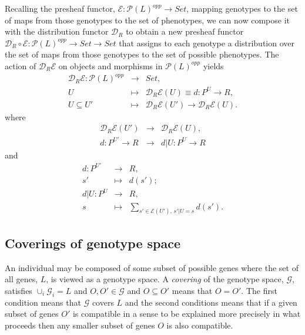 Recalling the presheaf functor, $\mathcal{E} \colon \mathcal{P}(L)^{opp} \rightarrow Set$, mapping genotypes to the set of maps from those genotypes to the set of phenotypes, we can now compose it with the distribution functor $\mathcal{D}_R$ to obtain a new presheaf functor $\mathcal{D}_R \circ \mathcal{E} \colon \mathcal{P}(L)^{opp} \rightarrow Set \rightarrow Set$ that assigns to each genotype a distribution over the set of maps from those genotypes to the set of possible phenotypes. The action of $\mathcal{D}_R \mathcal{E}$ on objects and morphisms in $\mathcal{P}(L)^{opp}$ yields
\begin{eqnarray*}
\mathcal{D}_R \mathcal{E} \colon \mathcal{P}(L)^{opp} &\rightarrow& Set,\\
U &\mapsto& \mathcal{D}_R \mathcal{E}(U) \equiv d \colon P^U \rightarrow R,\\
U \subseteq U' &\mapsto& \mathcal{D}_R \mathcal{E}(U') \rightarrow \mathcal{D}_R \mathcal{E}(U).
\end{eqnarray*}
where
\begin{eqnarray*}
\mathcal{D}_R \mathcal{E}(U') &\rightarrow& \mathcal{D}_R \mathcal{E}(U),\\
d \colon P^{U'} \rightarrow R &\rightarrow& d|U \colon P^{U} \rightarrow R
\end{eqnarray*}
and
\begin{eqnarray*}
d \colon P^{U'} &\rightarrow& R,\\
s' &\mapsto& d(s');\\
d|U \colon P^{U} &\rightarrow& R,\\
s &\mapsto& \sum_{s' \in \mathcal{E}(U'),\, s'|U=s} d(s').
\end{eqnarray*}

\subsection*{Coverings of genotype space}
An individual may be composed of some subset of possible genes where the set of all genes, $L$, is viewed as a genotype space. A \emph{covering} of the genotype space, $\mathcal{G}$, satisfies $\cup_i \mathcal{G}_i = L$ and $O,O' \in \mathcal{G}$ and $O \subseteq O'$ means that $O = O'$. The first condition means that $\mathcal{G}$ covers $L$ and the second conditions means that if a given subset of genes $O'$ is compatible in a sense to be explained more precisely in what proceeds then any smaller subset of genes $O$ is also compatible.

